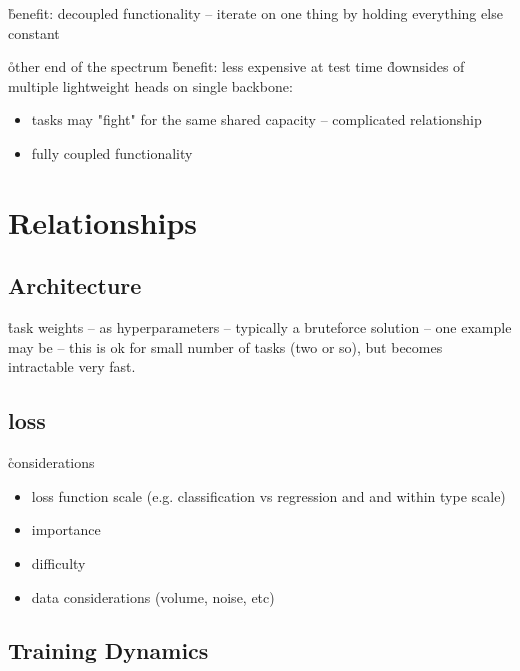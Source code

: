 \r{benefit: decoupled functionality -- iterate on one thing by holding everything else constant}

\r{other end of the spectrum}
\r{benefit: less expensive at test time}
\r{downsides of multiple lightweight heads on single backbone:}
\begin{itemize}[noitemsep,topsep=0pt]
	\item tasks may "fight" for the same shared capacity -- complicated relationship
	\item fully coupled functionality
\end{itemize}

\section{Relationships}


\subsection{Architecture}

\r{task weights -- as hyperparameters -- typically a bruteforce solution -- one example may be \cite{kirillov2019panoptic} -- this is ok for small number of tasks (two or so), but becomes intractable very fast.}

\subsection{loss}

\r{considerations}
\begin{itemize}[noitemsep,topsep=0pt]
	\item loss function scale (e.g. classification vs regression and and within type scale)
	\item importance
	\item difficulty
	\item data considerations (volume, noise, etc)
\end{itemize}

\subsection{Training Dynamics}

